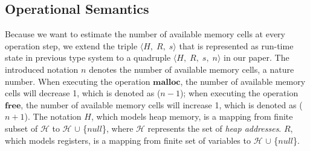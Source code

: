 \documentclass[english]{jssst_ppl} %
\newcommand\coma{,\;}
\newcommand\Malloc{\mathbf{malloc}}
\newcommand\Free{\mathbf{free}}
\begin{document}
\subsection{Operational Semantics}
Because we want to estimate the number of available memory cells at every operation step, we extend the triple $\langle H\coma R\coma s \rangle$ that is represented as run-time state in previous type system to a quadruple $\langle H\coma R\coma s\coma n \rangle$ in our paper. The introduced notation $n$ denotes the number of available memory cells, a nature number. When executing the operation $\Malloc$, the number of available memory cells will decrease 1, which is denoted as ($n - 1$); when executing the operation $\Free$, the number of available memory cells will increase 1, which is denoted as ($n + 1$). The notation $H$, which models heap memory, is a mapping from finite subset of $\mathcal{H}$ to $\mathcal{H}$ $\cup$ \{$null$\}, where $\mathcal{H}$ represents the set of \emph{heap addresses}. $R$, which models registers, is a mapping from finite set of variables to $\mathcal{H}$ $\cup$ \{$null$\}.
\end{document}
